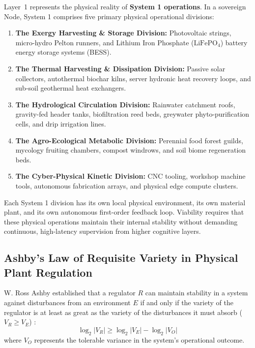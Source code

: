 Layer~1 represents the physical reality of \textbf{System 1 operations}. In a sovereign Node, System 1 comprises five primary physical operational divisions:
\begin{enumerate}
    \item \textbf{The Exergy Harvesting \& Storage Division:} Photovoltaic strings, micro-hydro Pelton runners, and Lithium Iron Phosphate ($\mathrm{LiFePO}_4$) battery energy storage systems (BESS).
    \item \textbf{The Thermal Harvesting \& Dissipation Division:} Passive solar collectors, autothermal biochar kilns, server hydronic heat recovery loops, and sub-soil geothermal heat exchangers.
    \item \textbf{The Hydrological Circulation Division:} Rainwater catchment roofs, gravity-fed header tanks, biofiltration reed beds, greywater phyto-purification cells, and drip irrigation lines.
    \item \textbf{The Agro-Ecological Metabolic Division:} Perennial food forest guilds, mycology fruiting chambers, compost windrows, and soil biome regeneration beds.
    \item \textbf{The Cyber-Physical Kinetic Division:} CNC tooling, workshop machine tools, autonomous fabrication arrays, and physical edge compute clusters.
\end{enumerate}
Each System 1 division has its own local physical environment, its own material plant, and its own autonomous first-order feedback loop. Viability requires that these physical operations maintain their internal stability without demanding continuous, high-latency supervision from higher cognitive layers.

\subsection{Ashby's Law of Requisite Variety in Physical Plant Regulation}

W. Ross Ashby established that a regulator $R$ can maintain stability in a system against disturbances from an environment $E$ if and only if the variety of the regulator is at least as great as the variety of the disturbances it must absorb ($V_R \ge V_E$) \parencite{ashby1956}:
\begin{equation}
\log_2 |V_R| \ge \log_2 |V_E| - \log_2 |V_O|
\label{eq:l1_ashby_law}
\end{equation}
where $V_O$ represents the tolerable variance in the system's operational outcome.

